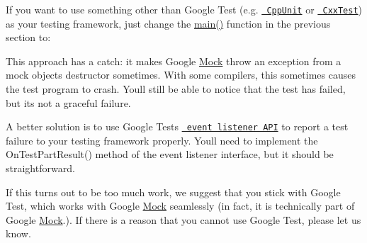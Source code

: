 If you want to use something other than Google Test (e.\+g. \href{http://sourceforge.net/projects/cppunit/}{\texttt{ Cpp\+Unit}} or \href{https://cxxtest.com/}{\texttt{ Cxx\+Test}}) as your testing framework, just change the {\ttfamily \mbox{\hyperlink{_be_01vektoriaus_2main_8cpp_ae66f6b31b5ad750f1fe042a706a4e3d4}{main()}}} function in the previous section to\+: 
\begin{DoxyCode}{0}
\DoxyCodeLine{  \textcolor{comment}{// The following line causes Google Mock to throw an exception on failure,}}
\DoxyCodeLine{  \textcolor{comment}{// which will be interpreted by your testing framework as a test failure.}}
\DoxyCodeLine{\}}
\end{DoxyCode}


This approach has a catch\+: it makes Google \mbox{\hyperlink{class_mock}{Mock}} throw an exception from a mock object\textquotesingle{}s destructor sometimes. With some compilers, this sometimes causes the test program to crash. You\textquotesingle{}ll still be able to notice that the test has failed, but it\textquotesingle{}s not a graceful failure.

A better solution is to use Google Test\textquotesingle{}s \href{../../googletest/docs/advanced.md\#extending-googletest-by-handling-test-events}{\texttt{ event listener A\+PI}} to report a test failure to your testing framework properly. You\textquotesingle{}ll need to implement the {\ttfamily On\+Test\+Part\+Result()} method of the event listener interface, but it should be straightforward.

If this turns out to be too much work, we suggest that you stick with Google Test, which works with Google \mbox{\hyperlink{class_mock}{Mock}} seamlessly (in fact, it is technically part of Google \mbox{\hyperlink{class_mock}{Mock}}.). If there is a reason that you cannot use Google Test, please let us know.

